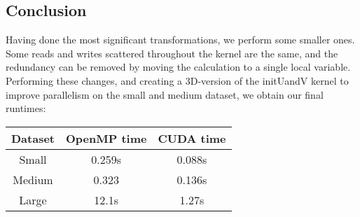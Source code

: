 \subsection{Conclusion}
Having done the most significant transformations, we perform some smaller ones. Some reads and writes scattered throughout the kernel are the same, and the redundancy can be removed by moving the calculation to a single local variable. Performing these changes, and creating a 3D-version of the initUandV kernel to improve parallelism on the small and medium dataset, we obtain our final runtimes:

\begin{tabular}{c|c|c}
    Dataset & OpenMP time & CUDA time \\ \hline
       Small & 0.259s & 0.088s \\
            Medium & 0.323 & 0.136s \\
                Large & 12.1s   & 1.27s
\end{tabular}
